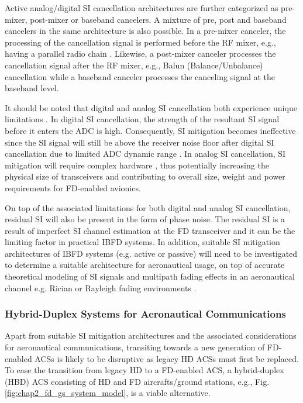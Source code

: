 Active analog/digital SI cancellation architectures are further categorized as pre-mixer, post-mixer or baseband cancelers. A mixture of pre, post and baseband cancelers in the same architecture is also possible. In a pre-mixer canceler, the processing of the cancellation signal is performed before the RF mixer, e.g., having a parallel radio chain \cite{ahmed2015all}. Likewise, a post-mixer canceler processes the cancellation signal after the RF mixer, e.g., Balun (Balance/Unbalance) cancellation \cite{jain2011practical} while a baseband canceler processes the canceling signal at the baseband level.

It should be noted that digital and analog SI cancellation both experience unique limitations \cite{sahai2013impact}. In digital SI cancellation, the strength of the resultant SI signal before it enters the ADC is high. Consequently, SI mitigation becomes ineffective since the SI signal will still be above the receiver noise floor after digital SI cancellation due to limited ADC dynamic range \cite{sabharwal2014band}. In analog SI cancellation, SI mitigation will require complex hardware \cite{everett2016softnull}, thus potentially increasing the physical size of transceivers and contributing to overall size, weight and power requirements for FD-enabled avionics. 

On top of the associated limitations for both digital and analog SI cancellation, residual SI will also be present in the form of phase noise. The residual SI is a result of imperfect SI channel estimation at the FD transceiver \cite{sahai2013impact} and it can be the limiting factor in practical IBFD systems. In addition, suitable SI mitigation architectures of IBFD systems (e.g. active or passive) will need to be investigated to determine a suitable architecture for aeronautical usage, on top of accurate theoretical modeling of SI signals and multipath fading effects in an aeronautical channel e.g. Rician or Rayleigh fading environments \cite{haas2002aeronautical}.

\subsubsection{Hybrid-Duplex Systems for Aeronautical Communications}
Apart from suitable SI mitigation architectures and the associated considerations for aeronautical communications, transiting towards a new generation of FD-enabled ACSs is likely to be disruptive as legacy HD ACSs must first be replaced. To ease the transition from legacy HD to a FD-enabled ACS, a hybrid-duplex (HBD) ACS consisting of HD and FD aircrafts/ground stations, e.g., Fig. \ref{fig:chap2_fd_gs_system_model}, is a viable alternative. 

